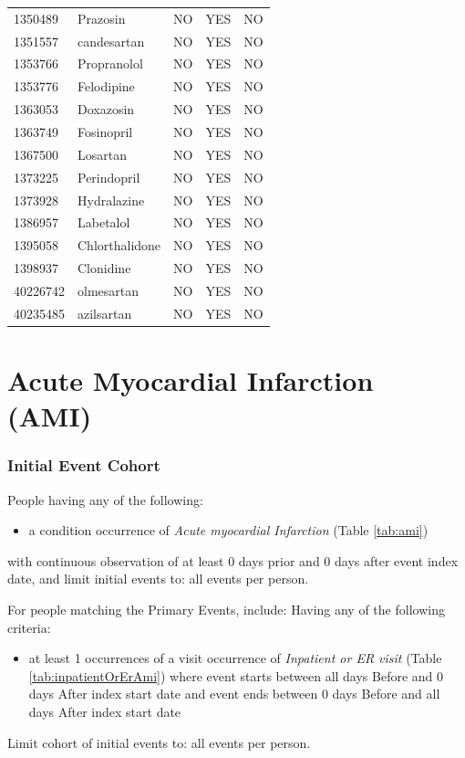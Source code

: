\documentclass[10.5pt]{book}
\providecommand{\tightlist}{%
  \setlength{\itemsep}{0pt}\setlength{\parskip}{0pt}}
\theoremstyle{definition}
\theoremstyle{definition}
\theoremstyle{definition}
\theoremstyle{remark}
\begin{document}
\begin{longtable}[]{@{}lllll@{}}
1350489 & Prazosin & NO & YES & NO\tabularnewline
1351557 & candesartan & NO & YES & NO\tabularnewline
1353766 & Propranolol & NO & YES & NO\tabularnewline
1353776 & Felodipine & NO & YES & NO\tabularnewline
1363053 & Doxazosin & NO & YES & NO\tabularnewline
1363749 & Fosinopril & NO & YES & NO\tabularnewline
1367500 & Losartan & NO & YES & NO\tabularnewline
1373225 & Perindopril & NO & YES & NO\tabularnewline
1373928 & Hydralazine & NO & YES & NO\tabularnewline
1386957 & Labetalol & NO & YES & NO\tabularnewline
1395058 & Chlorthalidone & NO & YES & NO\tabularnewline
1398937 & Clonidine & NO & YES & NO\tabularnewline
40226742 & olmesartan & NO & YES & NO\tabularnewline
40235485 & azilsartan & NO & YES & NO\tabularnewline
\bottomrule
\end{longtable}

\section{Acute Myocardial Infarction (AMI)}\label{Ami}

\subsubsection*{Initial Event Cohort}\label{initial-event-cohort-2}

People having any of the following:

\begin{itemize}
\tightlist
\item
  a condition occurrence of \emph{Acute myocardial Infarction} (Table
  \ref{tab:ami})
\end{itemize}

with continuous observation of at least 0 days prior and 0 days after
event index date, and limit initial events to: all events per person.

For people matching the Primary Events, include: Having any of the
following criteria:

\begin{itemize}
\tightlist
\item
  at least 1 occurrences of a visit occurrence of \emph{Inpatient or ER
  visit} (Table \ref{tab:inpatientOrErAmi}) where event starts between
  all days Before and 0 days After index start date and event ends
  between 0 days Before and all days After index start date
\end{itemize}

Limit cohort of initial events to: all events per person.
\end{document}
